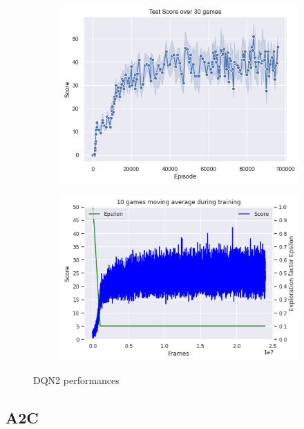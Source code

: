 \documentclass{article}
\begin{document}
\begin{figure}[H]
\centering
\begin{subfigure}{0.49\textwidth}
\centering
\includegraphics[scale=0.39]{DQNTestScore.PNG}
\end{subfigure}
\begin{subfigure}{0.49\textwidth}
\centering
\includegraphics[scale=0.39]{DQNMovAvgTraining.PNG}
\end{subfigure}
\caption{DQN2 performances}
\label{fig:DQN2}
\end{figure}


\subsection{A2C}
\end{document}
